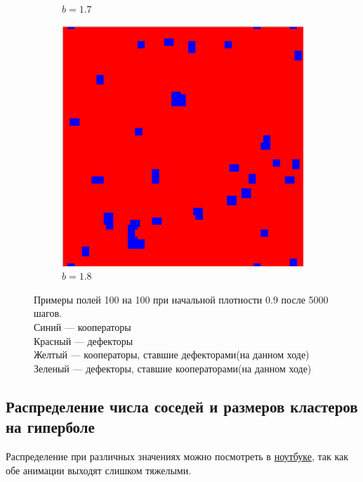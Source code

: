 \documentclass[12pt]{article}
\begin{document}
\begin{figure}[!htbp]
\begin{subfigure}{.33\textwidth}
          \caption{$b=1.7$}
          \label{fig:sub8}
        \end{subfigure}%
        \begin{subfigure}{.33\textwidth}
          \centering
          \includegraphics[width=.9\linewidth]{MeanFieldGame/snapshot_b=18.jpg}
          \caption{$b=1.8$}
          \label{fig:sub9}
        \end{subfigure}
    
        
        \caption{ Примеры полей 100 на 100 при начальной плотности $0.9$ после 5000 шагов.\\
        Синий — кооператоры\\
        Красный — дефекторы\\
        Желтый — кооператоры, ставшие дефекторами(на данном ходе)\\
        Зеленый — дефекторы, ставшие кооператорами(на данном ходе)}
        \label{fig:fields}
    \end{figure}
    
\subsection{Распределение числа соседей и размеров кластеров на гиперболе}
    Распределение при различных значениях можно посмотреть в \href{https://github.com/ADmitri42/spatial-evolutionary-game/blob/master/2DMeanGame.ipynb}{ноутбуке}, так как обе анимации выходят слишком тяжелыми.
\end{document}
